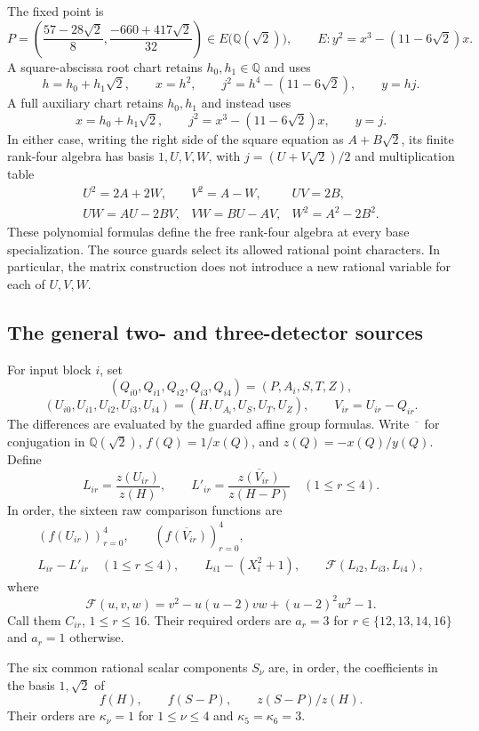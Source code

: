 \documentclass[11pt]{article}
\begin{document}
The fixed point is
\[
 P=\left(\frac{57-28\sqrt2}{8},
         \frac{-660+417\sqrt2}{32}\right)
       \in E\bigl(\mathbb Q(\sqrt2)\bigr),
 \qquad E:y^2=x^3-(11-6\sqrt2)x.
\]
A square-abscissa root chart retains $h_0,h_1\in\mathbb Q$ and
uses
\[
 h=h_0+h_1\sqrt2,\qquad x=h^2,\qquad
 j^2=h^4-(11-6\sqrt2),\qquad y=hj.
\]
A full auxiliary chart retains $h_0,h_1$ and instead uses
\[
 x=h_0+h_1\sqrt2,\qquad
 j^2=x^3-(11-6\sqrt2)x,\qquad y=j.
\]
In either case, writing the right side of the square equation as
$A+B\sqrt2$, its finite rank-four algebra has basis $1,U,V,W$,
with $j=(U+V\sqrt2)/2$ and multiplication table
\[
 \begin{array}{lll}
 U^2=2A+2W,& V^2=A-W,& UV=2B,\\
 UW=AU-2BV,& VW=BU-AV,& W^2=A^2-2B^2.
 \end{array}
\]
These polynomial formulas define the free rank-four algebra at
every base specialization.  The source guards select its allowed
rational point characters.  In particular, the matrix construction
does not introduce a new rational variable for each of $U,V,W$.

\subsection{The general two- and three-detector sources}

For input block $i$, set
\[
 (Q_{i0},Q_{i1},Q_{i2},Q_{i3},Q_{i4})=(P,A_i,S,T,Z),
\]
\[
 (U_{i0},U_{i1},U_{i2},U_{i3},U_{i4})
                    =(H,U_{A_i},U_S,U_T,U_Z),
 \qquad V_{ir}=U_{ir}-Q_{ir}.
\]
The differences are evaluated by the guarded affine group formulas.
Write $\overline{\phantom{x}}$ for conjugation in
$\mathbb Q(\sqrt2)$, $f(Q)=1/x(Q)$, and $z(Q)=-x(Q)/y(Q)$.
Define
\[
 L_{ir}=\frac{z(U_{ir})}{z(H)},\qquad
 L'_{ir}=\overline{\frac{z(V_{ir})}{z(H-P)}}\quad(1\le r\le4).
\]
In order, the sixteen raw comparison functions are
\[
 \begin{gathered}
 (f(U_{ir}))_{r=0}^4,\qquad
 (\overline{f(V_{ir})})_{r=0}^4,\\
 L_{ir}-L'_{ir}\quad(1\le r\le4),\qquad
 L_{i1}-(X_i^2+1),\qquad
 \mathcal F(L_{i2},L_{i3},L_{i4}),
 \end{gathered}
\]
where
\[
          \mathcal F(u,v,w)=v^2-u(u-2)vw+(u-2)^2w^2-1.
\]
Call them $C_{ir}$, $1\le r\le16$.  Their required orders are
$a_r=3$ for $r\in\{12,13,14,16\}$ and $a_r=1$ otherwise.

The six common rational scalar components $S_\nu$ are, in order,
the coefficients in the basis $1,\sqrt2$ of
\[
                         f(H),\qquad f(S-P),\qquad
                         z(S-P)/z(H).
\]
Their orders are $\kappa_\nu=1$ for $1\le\nu\le4$ and
$\kappa_5=\kappa_6=3$.
\end{document}
